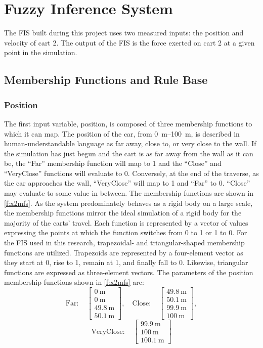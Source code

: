\section{Fuzzy Inference System}The FIS built during this project uses two measured inputs: the position and velocity of cart 2. The output of
the FIS is the force exerted on cart 2 at a given point in the simulation.

\subsection{Membership Functions and Rule Base} \subsubsection{Position} The first input variable, position,
is composed of three membership functions to which it can map. The position of the car, from
\SIrange{0}{100}{\metre}, is described in human-understandable language as far away, close to, or very close
to the wall. If the simulation has just begun and the cart is as far away from the wall as it can be, the
``Far'' membership function will map to 1 and the ``Close'' and ``VeryClose'' functions will evaluate to 0.
Conversely, at the end of the traverse, as the car approaches the wall, ``VeryClose'' will map to 1 and
``Far'' to 0. ``Close'' may evaluate to some value in between. The membership functions are shown in
\cref{f:x2mfs}. As the system predominately behaves as a rigid body on a large scale, the membership
functions mirror the ideal simulation of a rigid body for the majority of the carts' travel. Each function is
represented by a vector of values expressing the points at which the function switches from 0 to 1 or 1 to 0.
For the FIS used in this research, trapezoidal- and triangular-shaped membership functions are utilized.
Trapezoids are represented by a four-element vector as they start at 0, rise to 1, remain at 1, and finally
fall to 0. Likewise, triangular functions are expressed as three-element vectors. The parameters of the
position membership functions shown in \cref{f:x2mfs} are: \begin{displaymath} \mathrm{Far:}\quad
\begin{bmatrix} \SI{0}{\metre}\\\SI{0}{\metre}\\\SI{49.8}{\metre}\\\SI{50.1}{\metre}
\end{bmatrix}, \quad \mathrm{Close:}\quad \begin{bmatrix}
    \SI{49.8}{\metre}\\\SI{50.1}{\metre}\\\SI{99.9}{\metre}\\\SI{100}{\metre} \end{bmatrix}, \end{displaymath}
\begin{displaymath} \mathrm{VeryClose:}\quad \begin{bmatrix}
\SI{99.9}{\metre}\\\SI{100}{\metre}\\\SI{100.1}{\metre} \end{bmatrix} \end{displaymath}

